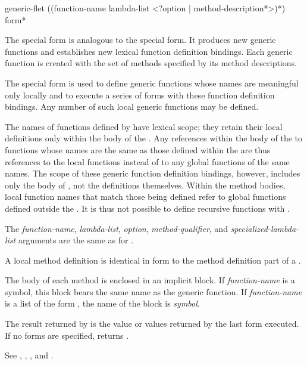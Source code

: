 \begin{defspec}
generic-flet ({(function-name lambda-list
                <?option | {method-description}*>)}*)
            {\,form}*

The  special form is analogous to the
 special form.  It produces new generic functions and
establishes new lexical function definition bindings.  Each generic
function is created with the set of methods specified by its method
descriptions.

The special form  is used to define generic functions whose
names are meaningful only locally and to execute a series of forms
with these function definition bindings.  Any number of such local
generic functions may be defined.

The names of functions defined by  have lexical
scope; they retain their local definitions only within the body of the
.  Any references within the body of the 
 to functions whose names are the same as those defined
within the  are thus references to the local
functions instead of to any global functions of the same names.  The
scope of these generic function definition bindings, however, includes only
the body of , not the definitions themselves.
Within the method bodies, local function names that match those
being defined refer to global functions defined outside the 
.  It is thus not possible to define recursive functions
with .




The {\it function-name\/}, {\it lambda-list\/}, {\it option}, {\it
method-qualifier}, and {\it specialized-lambda-list\/} arguments are
the same as for .

A  local method definition is identical in form to the
method definition part of a .

The body of each method is enclosed in an implicit block.  If {\it
function-name\/} is a symbol, this block bears the same name as
the generic function.  If {\it function-name\/} is a list of the
form , the name of the block is {\it
symbol}.  


The result returned by  is the value or values
returned by the last form executed.  If no forms are specified, 
 returns .

See , , , and .
\end{defspec}


